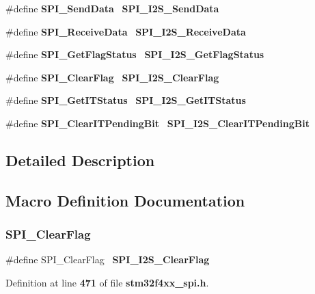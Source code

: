 \begin{DoxyCompactItemize}
\item 
\#define \textbf{ S\+P\+I\+\_\+\+Send\+Data}~\textbf{ S\+P\+I\+\_\+\+I2\+S\+\_\+\+Send\+Data}
\item 
\#define \textbf{ S\+P\+I\+\_\+\+Receive\+Data}~\textbf{ S\+P\+I\+\_\+\+I2\+S\+\_\+\+Receive\+Data}
\item 
\#define \textbf{ S\+P\+I\+\_\+\+Get\+Flag\+Status}~\textbf{ S\+P\+I\+\_\+\+I2\+S\+\_\+\+Get\+Flag\+Status}
\item 
\#define \textbf{ S\+P\+I\+\_\+\+Clear\+Flag}~\textbf{ S\+P\+I\+\_\+\+I2\+S\+\_\+\+Clear\+Flag}
\item 
\#define \textbf{ S\+P\+I\+\_\+\+Get\+I\+T\+Status}~\textbf{ S\+P\+I\+\_\+\+I2\+S\+\_\+\+Get\+I\+T\+Status}
\item 
\#define \textbf{ S\+P\+I\+\_\+\+Clear\+I\+T\+Pending\+Bit}~\textbf{ S\+P\+I\+\_\+\+I2\+S\+\_\+\+Clear\+I\+T\+Pending\+Bit}
\end{DoxyCompactItemize}


\subsection{Detailed Description}


\subsection{Macro Definition Documentation}
\mbox{\label{group__SPI__I2S__Legacy_ga9fde1f0c2f8d9f5690fe3d058d16ed5c}} 
\subsubsection{S\+P\+I\+\_\+\+Clear\+Flag}
{\footnotesize\ttfamily \#define S\+P\+I\+\_\+\+Clear\+Flag~\textbf{ S\+P\+I\+\_\+\+I2\+S\+\_\+\+Clear\+Flag}}



Definition at line \textbf{ 471} of file \textbf{ stm32f4xx\+\_\+spi.\+h}.

\mbox{\label{group__SPI__I2S__Legacy_gab5f0a306ab6c4dc0775314f367fe935e}} 
